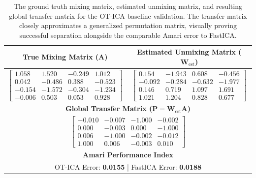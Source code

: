 \documentclass[12pt,a4paper,twoside,openany]{book}
\begin{document}
\begin{table}[tbp]
    \centering
    \small
    \begin{tabular}{cc}
        \toprule
        \textbf{True Mixing Matrix ($\mathbf{A}$)} & \textbf{Estimated Unmixing Matrix ($\mathbf{W}_{\text{est}}$)} \\
        \midrule
        $
        \begin{bmatrix}
         1.058 &  1.520 & -0.249 &  1.012 \\
         0.042 & -0.486 &  0.388 & -0.523 \\
        -0.154 & -1.572 & -0.304 & -1.234 \\
        -0.006 &  0.503 &  0.053 &  0.928 
        \end{bmatrix}
        $ 
        & 
        $
        \begin{bmatrix}
         0.154 & -1.943 &  0.608 & -0.456 \\
        -0.092 & -0.284 & -0.632 & -1.977 \\
         0.146 &  0.719 &  1.097 &  1.691 \\
         1.021 &  1.204 &  0.828 &  0.677 
        \end{bmatrix}
        $ \\
        \midrule
        \multicolumn{2}{c}{\textbf{Global Transfer Matrix ($\mathbf{P} = \mathbf{W}_{\text{est}}\mathbf{A}$)}} \\
        \midrule
        \multicolumn{2}{c}{
        $
        \begin{bmatrix}
        -0.010 & -0.007 & -1.000 & -0.002 \\
         0.000 & -0.003 &  0.000 & -1.000 \\
         0.006 & -1.000 & -0.002 & -0.012 \\
         1.000 &  0.006 & -0.003 &  0.010 
        \end{bmatrix}
        $
        } \\
        \midrule
        \multicolumn{2}{c}{\textbf{Amari Performance Index}} \\
        \midrule
        \multicolumn{2}{c}{OT-ICA Error: \textbf{0.0155} \quad | \quad FastICA Error: \textbf{0.0188}} \\
        \bottomrule
    \end{tabular}
    \caption[Baseline Matrices and Amari Error]{The ground truth mixing matrix, estimated unmixing matrix, and resulting global transfer matrix for the OT-ICA baseline validation. 
    The transfer matrix closely approximates a generalized permutation matrix, visually proving successful separation alongside the comparable Amari error to FastICA.}
    \label{tab:baseline_matrices}
\end{table}
\end{document}
